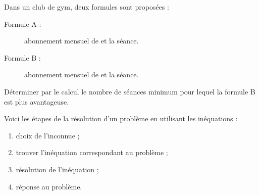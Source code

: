 \documentclass[10pt,openright,twoside,french]{book}
\begin{document}
\begin{Exemple}
    Dans un club de gym, deux formules sont proposées :
    \begin{description}
        \item[Formule A :] abonnement mensuel de  et  la séance.
        \item[Formule B :] abonnement mensuel de  et  la séance.
    \end{description}
    Déterminer par le calcul le nombre de séances minimum pour lequel la formule B est plus avantageuse.
\end{Exemple}\medskip

Voici les étapes de la résolution d'un problème en utilisant les inéquations :
\begin{enumerate}
    \item choix de l'inconnue ;
    \item trouver l'inéquation correspondant au problème ;
    \item résolution de l'inéquation ;
    \item réponse au problème.
\end{enumerate}\medskip
\end{document}
